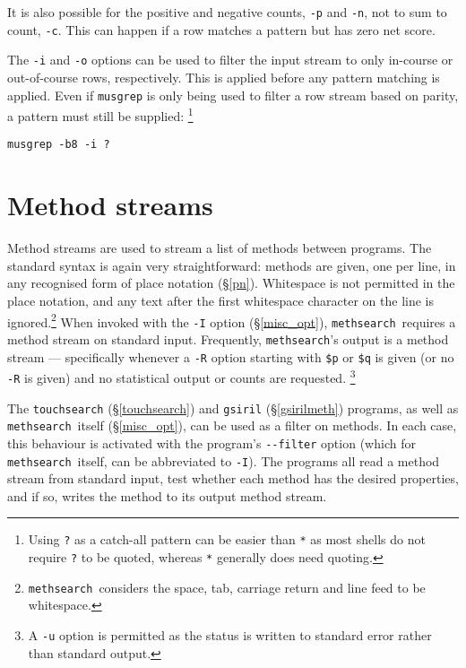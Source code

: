 \documentclass[a4paper,11pt,oneside]{book}
\makeatletter
\newcommand{\oi}[1]{\index{#1@{\hspace*{-\optwidth}\texttt{-}\texttt{#1}}}}
\def\methsearch{\texttt{meth\-search}}
\newcommand{\sref}[1]{\hyperref[#1]{\S\ref{#1}}}
\makeatother
\begin{document}
It is also possible for the positive and negative counts, 
\verb+-p+ and \verb+-n+, not to sum to count, \verb+-c+.  This can happen
if a row matches a pattern but has zero net score.  

The \verb+-i+ and \verb+-o+ options can be used to filter the input stream
to only in-course or out-of-course rows, respectively.  This is applied before
any pattern matching is applied.  Even if \texttt{musgrep} is only being 
used to filter a row stream based on parity, a pattern must still be supplied:%
\footnote{Using \verb+?+ as a catch-all pattern can be easier than \verb+*+
as most shells do not require \verb+?+ to be quoted, whereas \verb+*+ generally
does need quoting.}
\begin{Verbatim}[commandchars=@~~]
musgrep -b8 -i ?
\end{Verbatim}


\section{Method streams}\label{methstream}

Method streams are used to stream a list of methods between programs.  
The standard syntax is again very straightforward: methods are given,
one per line, in any recognised form of place notation (\sref{pn}).  
Whitespace is not permitted in the place notation, and any text after
the first whitespace character on the line is ignored.\footnote{%
\methsearch\ considers the space, tab, carriage return and line feed
to be whitespace.}
When invoked with the \verb+-I+ option (\sref{misc_opt}), 
\methsearch\ requires a method stream on standard input.
Frequently, \methsearch's output is a method stream — specifically
whenever a \verb+-R+ option starting with \verb+$p+ or \verb+$q+ is given
(or no \verb+-R+ is given) and no statistical output or counts are requested.%
\footnote{A \verb+-u+ option is permitted as the status is written 
to standard error rather than standard output.%
}

The \verb+touchsearch+ (\sref{touchsearch}) 
and \verb+gsiril+ (\sref{gsirilmeth}) programs, 
as well as \methsearch\ itself (\sref{misc_opt}),
can be used as a filter on methods.  
In each case, this behaviour is activated with the program's \verb+--filter+ 
option (which for \methsearch\ itself, can be abbreviated to \verb+-I+).\oi{I}  
The programs all read a method stream from standard input,
test whether each method has the desired properties, and if so, writes
the method to its output method stream.
\end{document}
